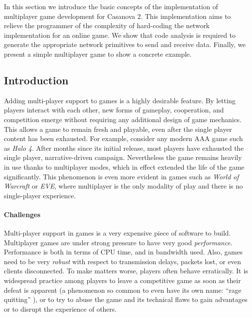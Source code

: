 In this section we introduce the basic concepts of the implementation of multiplayer game development for Casanova 2. This implementation aims to relieve the programmer of the complexity of hard-coding the network implementation for an online game. We show that code analysis is required to generate the appropriate network primitives to send and receive data. Finally, we present a simple multiplayer game to show a concrete example.

\subsection*{Introduction}
Adding multi-player support to games is a highly desirable feature. By letting players interact with each other, new forms of gameplay, cooperation, and competition emerge without requiring any additional design of game mechanics. This allows a game to remain fresh and playable, even after the single player content has been exhausted. For example, consider any modern AAA game such as \textit{Halo 4}. After months since its initial release, most players have exhausted the single player, narrative-driven campaign. Nevertheless the game remains heavily in use thanks to multiplayer modes, which in effect extended the life of the game significantly. This phenomenon is even more evident in games such as \textit{World of Warcraft} or \textit{EVE}, where multiplayer is the only modality of play and there is no single-player experience.

\paragraph*{Challenges}
Multi-player support in games is a very expensive piece of software to build. Multiplayer games are under strong pressure to have very good \textit{performance}. Performance is both in terms of CPU time, and in bandwidth used. Also, games need to be very \textit{robust} with respect to transmission delays, packets lost, or even clients disconnected. To make matters worse, players often behave erratically. It is widespread practice among players to leave a competitive game as soon as their defeat is apparent (a phenomenon so common to even have its own name: ``rage quitting'' \cite{rage_quitting}), or to try to abuse the game and its technical flaws to gain advantages or to disrupt the experience of others.

